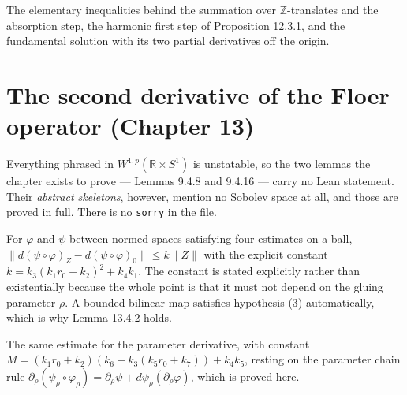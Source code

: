 \begin{proposition}
  \label{prop:12.3}
  \leanok
  The elementary inequalities behind the summation over $\mathbb{Z}$-translates
  and the absorption step, the harmonic first step of Proposition 12.3.1, and the
  fundamental solution with its two partial derivatives off the origin.
\end{proposition}

\chapter{The second derivative of the Floer operator (Chapter 13)}

Everything phrased in $W^{1,p}(\mathbb{R}\times S^1)$ is unstatable, so the two
lemmas the chapter exists to prove --- Lemmas 9.4.8 and 9.4.16 --- carry no Lean
statement.  Their \emph{abstract skeletons}, however, mention no Sobolev space
at all, and those are proved in full.  There is no \texttt{sorry} in the file.

\begin{lemma}[Lemma 13.4.1]
  \label{lem:13.4.1}
  \leanok
  For $\varphi$ and $\psi$ between normed spaces satisfying four estimates on a
  ball, $\lVert d(\psi\circ\varphi)_Z - d(\psi\circ\varphi)_0\rVert \le k\lVert
  Z\rVert$ with the explicit constant $k = k_3(k_1r_0+k_2)^2 + k_4k_1$.  The
  constant is stated explicitly rather than existentially because the whole point
  is that it must not depend on the gluing parameter $\rho$.  A bounded bilinear
  map satisfies hypothesis (3) automatically, which is why Lemma 13.4.2 holds.
\end{lemma}

\begin{lemma}[Lemma 13.5.1]
  \label{lem:13.5.1}
  \leanok
  The same estimate for the parameter derivative, with constant
  $M = (k_1r_0+k_2)(k_6+k_3(k_5r_0+k_7)) + k_4k_5$, resting on the parameter
  chain rule $\partial_\rho(\psi_\rho\circ\varphi_\rho) = \partial_\rho\psi +
  d\psi_\rho(\partial_\rho\varphi)$, which is proved here.
\end{lemma}

